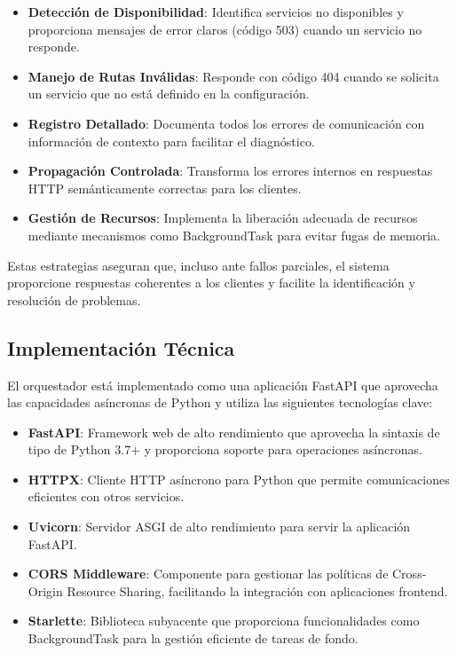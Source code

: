 \documentclass[12pt,a4paper]{article}
\begin{document}
\begin{itemize}
    \item \textbf{Detección de Disponibilidad}: Identifica servicios no disponibles y proporciona mensajes de error claros (código 503) cuando un servicio no responde.
    
    \item \textbf{Manejo de Rutas Inválidas}: Responde con código 404 cuando se solicita un servicio que no está definido en la configuración.
    
    \item \textbf{Registro Detallado}: Documenta todos los errores de comunicación con información de contexto para facilitar el diagnóstico.
    
    \item \textbf{Propagación Controlada}: Transforma los errores internos en respuestas HTTP semánticamente correctas para los clientes.
    
    \item \textbf{Gestión de Recursos}: Implementa la liberación adecuada de recursos mediante mecanismos como BackgroundTask para evitar fugas de memoria.
\end{itemize}

Estas estrategias aseguran que, incluso ante fallos parciales, el sistema proporcione respuestas coherentes a los clientes y facilite la identificación y resolución de problemas.

\subsection{Implementación Técnica}
\label{subsec:os-implementacion}

El orquestador está implementado como una aplicación FastAPI que aprovecha las capacidades asíncronas de Python y utiliza las siguientes tecnologías clave:

\begin{itemize}
    \item \textbf{FastAPI}: Framework web de alto rendimiento que aprovecha la sintaxis de tipo de Python 3.7+ y proporciona soporte para operaciones asíncronas.
    
    \item \textbf{HTTPX}: Cliente HTTP asíncrono para Python que permite comunicaciones eficientes con otros servicios.
    
    \item \textbf{Uvicorn}: Servidor ASGI de alto rendimiento para servir la aplicación FastAPI.
    
    \item \textbf{CORS Middleware}: Componente para gestionar las políticas de Cross-Origin Resource Sharing, facilitando la integración con aplicaciones frontend.
    
    \item \textbf{Starlette}: Biblioteca subyacente que proporciona funcionalidades como BackgroundTask para la gestión eficiente de tareas de fondo.
\end{itemize}
\end{document}
